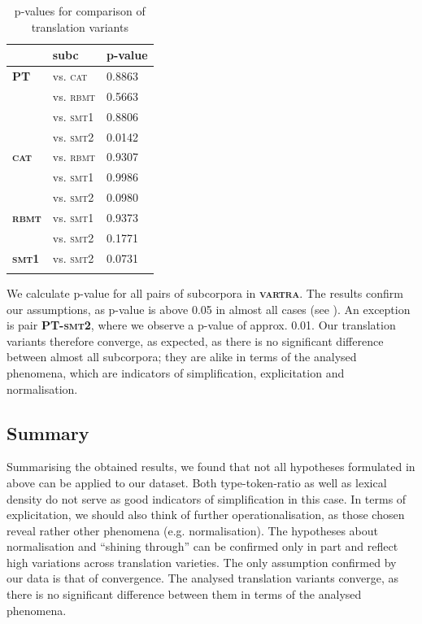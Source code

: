 \documentclass[output=paper]{LSP/langsci}
\begin{document}
\begin{table}
     \centering
     \begin{tabular}{lll}
          \lsptoprule
               & \textbf{subc}    & \textbf{p-value}  \\ \midrule
\textbf{PT}	   & vs. \textsc{cat}   & 0.8863     \\ 
	  	       & vs. \textsc{rbmt}  & 0.5663      \\ 
		       & vs. \textsc{smt}1  & 0.8806       \\
		       & vs. \textsc{smt}2  & 0.0142        \\ \midrule
\textbf{\textsc{cat}}   & vs. \textsc{rbmt}  & 0.9307         \\ 
			   & vs. \textsc{smt}1  & 0.9986  		 \\
			   & vs. \textsc{smt}2  & 0.0980           \\ \midrule
\textbf{\textsc{rbmt}}  & vs. \textsc{smt}1  & 0.9373            \\ 
			   & vs. \textsc{smt}2  & 0.1771			    \\ \midrule
\textbf{\textsc{smt}1}  & vs. \textsc{smt}2  & 0.0731 	         \\ 
\lspbottomrule
     \end{tabular}

 \caption{p-values for comparison of translation variants}
     \label{tab:4.5}
\end{table}   

We calculate p-value for all pairs of subcorpora in \textbf{\textsc{vartra}}. The results confirm our assumptions, as p-value is above 0.05 in almost all cases (see ). An exception is pair \textbf{PT-\textsc{smt}2}, where we observe a p-value of approx. 0.01. Our translation variants therefore converge, as expected, as there is no significant difference between almost all subcorpora; they are alike in terms of the analysed phenomena, which are indicators of simplification, explicitation and normalisation.

\subsection{Summary}

Summarising the obtained results, we found that not all hypotheses formulated in  above can be applied to our dataset. Both type-token-ratio as well as lexical density do not serve as good indicators of simplification in this case. In terms of explicitation, we should also think of further operationalisation, as those chosen reveal rather other phenomena (e.g. normalisation).  The hypotheses about normalisation and “shining through” can be confirmed only in part and reflect high variations across translation varieties.  The only assumption confirmed by our data is that of convergence.  The analysed translation variants converge, as there is no significant difference between them in terms of the analysed phenomena.
\end{document}
